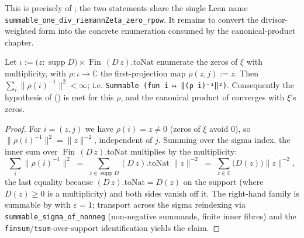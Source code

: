 This is precisely  of ; the two
statements share the single Lean name
\texttt{summable\_one\_div\_riemannZeta\_zero\_rpow}. It remains to convert
the divisor-weighted form into the concrete enumeration consumed by the
canonical-product chapter.

\begin{lemma}
\label{lem:zs_product}
\leanok
{}
Let $\iota:=\bigl(z:\operatorname{supp}D\bigr)\times\operatorname{Fin}\,(D\,z).\mathrm{toNat}$
enumerate the zeros of $\xi$ with multiplicity, with $\rho:\iota\to\mathbb C$ the
first-projection map $\rho(z,j):=z$. Then $\sum_{i}\|\rho(i)^{-1}\|^{2}<\infty$; i.e.
\texttt{Summable (fun i ↦ ‖(ρ i)⁻¹‖²)}. Consequently the hypothesis of
() is met for
this $\rho$, and the canonical product of  converges with $\xi$'s zeros.
\end{lemma}

\begin{proof}
\leanok
{}
For $i=(z,j)$ we have $\rho(i)=z\neq0$ (zeros of $\xi$ avoid $0$), so
$\|\rho(i)^{-1}\|^{2}=\|z\|^{-2}$, independent of $j$. Summing over the sigma index, the
inner sum over $\operatorname{Fin}\,(D\,z).\mathrm{toNat}$ multiplies by the multiplicity:
\[
  \sum_{i}\|\rho(i)^{-1}\|^{2}\;=\;\sum_{z\in\operatorname{supp}D}(D\,z).\mathrm{toNat}\;\|z\|^{-2}
  \;=\;\sum_{z\in\mathbb C}\bigl(D(z)\bigr)\|z\|^{-2},
\]
the last equality because $(D\,z).\mathrm{toNat}=D(z)$ on the support (where $D(z)\ge0$ is
a multiplicity) and both sides vanish off it. The right-hand family is summable by
 with $\varepsilon=1$; transport across the sigma reindexing via
\texttt{summable\_sigma\_of\_nonneg} (non-negative summands, finite inner fibres) and the
\texttt{finsum}/\texttt{tsum}-over-support identification yields the claim.
\end{proof}
